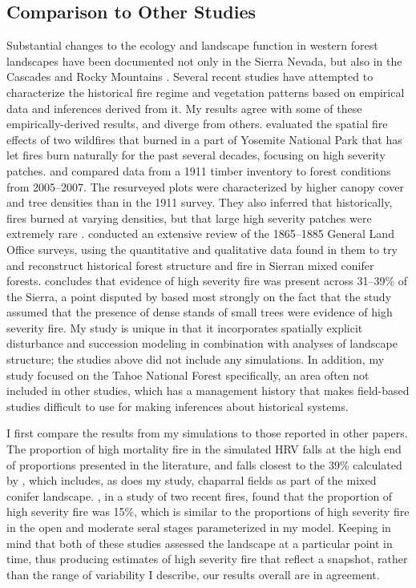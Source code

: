 \subsection{Comparison to Other Studies}
Substantial changes to the ecology and landscape function in western forest landscapes have been documented not only in the Sierra Nevada, but also in the Cascades and Rocky Mountains \citep{Hessburg2005,Baker2012,Baker2014,Mallek2013,Agee1993}. Several recent studies have attempted to characterize the historical fire regime and vegetation patterns based on empirical data and inferences derived from it. My results agree with some of these empirically-derived results, and diverge from others.
%
\citet{Collins2010} evaluated the spatial fire effects of two wildfires that burned in a part of Yosemite National Park that has let fires burn naturally for the past several decades, focusing on high severity patches.
%
\citet{Collins2011} and \citet{Stephens2015} compared data from a 1911 timber inventory to forest conditions from 2005--2007. The resurveyed plots were characterized by higher canopy cover and tree densities than in the 1911 survey. They also inferred that historically, fires burned at varying densities, but that large high severity patches were extremely rare \citep{Collins2011,Stephens2015}.
%
\citet{Baker2014} conducted an extensive review of the 1865--1885 General Land Office surveys, using the quantitative and qualitative data found in them to try and reconstruct historical forest structure and fire in Sierran mixed conifer forests. \citet{Baker2014} concludes that evidence of high severity fire was present across 31--39\% of the Sierra, a point disputed by \citet{Fule2014} based most strongly on the fact that the \citet{Baker2014} study assumed that the presence of dense stands of small trees were evidence of high severity fire. 
%
My study is unique in that it incorporates spatially explicit disturbance and succession modeling in combination with analyses of landscape structure; the studies above did not include any simulations. In addition, my study focused on the Tahoe National Forest specifically, an area often not included in other studies, which has a management history that makes field-based studies difficult to use for making inferences about historical systems.

I first compare the results from my simulations to those reported in other papers.  The proportion of high mortality fire in the simulated HRV falls at the high end of proportions presented in the literature, and falls closest to the 39\% calculated by \citet{Baker2014}, which includes, as does my study, chaparral fields as part of the mixed conifer landscape. \citet{Collins2010}, in a study of two recent fires, found that the proportion of high severity fire was 15\%, which is similar to the proportions of high severity fire in the open and moderate seral stages parameterized in my model. Keeping in mind that both of these studies assessed the landscape at a particular point in time, thus producing estimates of high severity fire that reflect a snapshot, rather than the range of variability I describe, our results overall are in agreement. 

